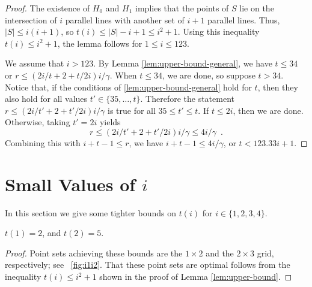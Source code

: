 \documentclass{ws-ijcga}
\begin{document}
\begin{proof}
The existence of $H_0$ and $H_1$ implies that the points of $S$ lie on 
the intersection of $i$ parallel lines with another set of $i+1$ parallel lines.
Thus, $|S|\le i(i+1)$, so $t(i) \le |S|-i+1\le i^2+1$.
Using this inequality $t(i)\le i^2+1$, the lemma follows for $1\le i\le 123$.

We assume that $i>123$.  By Lemma \ref{lem:upper-bound-general}, we
have $t\le 34$ or $r\le (2i/t + 2 + t/2i)  i/\gamma$.  When $t\le 34$,
we are done,
so suppose $t>34$.  Notice that, if the conditions of
\ref{lem:upper-bound-general} hold for $t$, then they also
hold for all values $t'\in\{35,\ldots,t\}$.  Therefore the statement
$r\le (2i/t' + 2 + t'/2i) i/\gamma$ is true for all $35\le t'\le t$.
If $t\le 2i$, then we are done.  Otherwise, taking $t'=2i$ yields
\[
  r\le (2i/t' + 2 + t'/2i) i/\gamma \le 4i/\gamma \enspace .
\]
Combining this with $i+t-1\le r$, we have $i+t-1\le 4i/\gamma$, or $t< 123.33i+1$.

\end{proof}


\section[Small Values of $i$]{\boldmath Small Values of $i$}

In this section we give some tighter bounds on $t(i)$ for
$i\in\{1,2,3,4\}$.

\begin{lemma}\label{lem:i1i2}
$t(1) = 2$, and $t(2)=5$.
\end{lemma}

\begin{proof}
Point sets achieving these bounds are the $1\times 2$ and the $2\times 3$
grid, respectively; see \figurename~\ref{fig:i1i2}.  
That these point sets are optimal follows from the inequality $t(i)\le i^2+1$ 
shown in the proof of Lemma \ref{lem:upper-bound}.
\end{proof}
\end{document}
